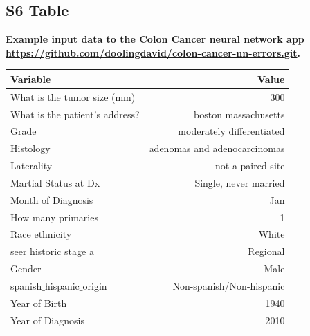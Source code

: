 \documentclass[10pt,letterpaper]{article}
\begin{document}
\subsection*{S6 Table}
\label{S6_Table}
{\bf Example input data to the Colon Cancer neural network app \url{https://github.com/doolingdavid/colon-cancer-nn-errors.git}.}
\begin{table}[!ht]
\begin{adjustwidth}{-2.25in}{0in} %
\begin{tabular}{lr}
\toprule
  Variable  & Value \\ 
\midrule
  What is the tumor size (mm) & 300 \\  
  What is the patient's address? & boston massachusetts \\ 
  Grade & moderately differentiated \\  
  Histology & adenomas and adenocarcinomas \\ 
  Laterality & not a paired site \\  
 Martial Status at Dx & Single, never married \\  
 Month of Diagnosis & Jan \\  
 How many primaries & 1 \\  
  Race$\_$ethnicity & White \\  
  seer$\_$historic$\_$stage$\_$a  & Regional \\ 
  Gender & Male \\  
  spanish$\_$hispanic$\_$origin & Non-spanish/Non-hispanic \\ 
 Year of Birth & 1940 \\  
  Year of Diagnosis & 2010 \\
\bottomrule
\end{tabular}
\end{adjustwidth}
\end{table}
\end{document}
